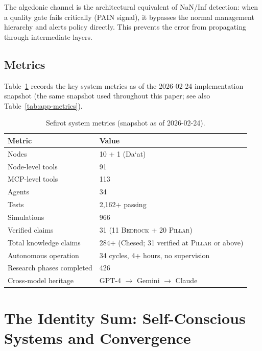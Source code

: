 \documentclass[11pt]{article}
\theoremstyle{definition}
\theoremstyle{remark}
\newcommand{\BEDROCK}{\textsc{Bedrock}}
\newcommand{\PILLAR}{\textsc{Pillar}}
\begin{document}
The algedonic channel is the architectural equivalent of NaN/Inf detection: when
a quality gate fails critically (PAIN signal), it bypasses the normal management
hierarchy and alerts policy directly.  This prevents the error from propagating
through intermediate layers.

\subsection{Metrics}
\label{sec:sefirot-metrics}

Table~\ref{tab:metrics} records the key system metrics as of the
2026-02-24 implementation snapshot (the same snapshot used throughout this
paper; see also Table~\ref{tab:app-metrics}).

\begin{table}[ht]
\centering
\caption{Sefirot system metrics (snapshot as of 2026-02-24).}
\label{tab:metrics}
\begin{tabular}{@{}ll@{}}
\toprule
\textbf{Metric} & \textbf{Value} \\
\midrule
Nodes                       & 10 + 1 (Da\textquoteleft at) \\
Node-level tools            & 91 \\
MCP-level tools             & 113 \\
Agents                      & 34 \\
Tests                       & 2,162+ passing \\
Simulations                 & 966 \\
Verified claims             & 31 (11 \BEDROCK{} + 20 \PILLAR) \\
Total knowledge claims      & 284+ (Chesed; 31 verified at \PILLAR{} or above) \\
Autonomous operation        & 34 cycles, 4+ hours, no supervision \\
Research phases completed   & 426 \\
Cross-model heritage        & GPT-4 $\to$ Gemini $\to$ Claude \\
\bottomrule
\end{tabular}
\end{table}

\section{The Identity Sum: Self-Conscious Systems and Convergence}
\label{sec:identity-sum}
\end{document}
